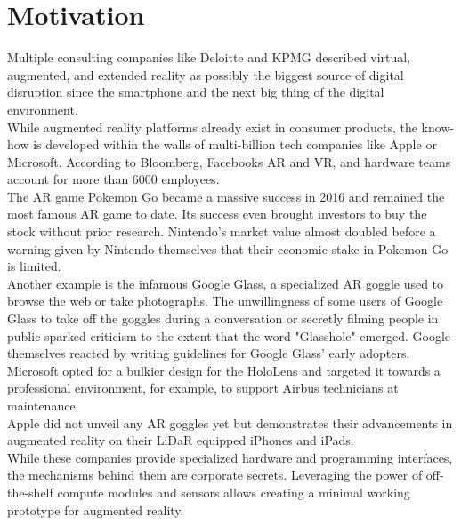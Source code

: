 \chapter{Motivation}
\label{sec:Motivation}
Multiple consulting companies like Deloitte and KPMG described virtual, augmented, and extended reality as possibly the biggest source of digital disruption since the smartphone\cite{KPMG_on_AR} and the next big thing of the digital environment\cite{Deloitte_on_AR}.\\
While augmented reality platforms already exist in consumer products, the know-how is developed within the walls of multi-billion tech companies like Apple or Microsoft. According to Bloomberg, Facebooks AR and VR, and hardware teams account for more than 6000 employees\cite{Bloomberg_on_AR}. \\
The AR game Pokemon Go became a massive success in 2016 and remained the most famous AR game to date. Its success even brought investors to buy the stock without prior research. Nintendo's market value almost doubled before a warning given by Nintendo themselves that their economic stake in Pokemon Go is limited.\cite{Nintendo_stock}\\ 
Another example is the infamous Google Glass, a specialized AR goggle used to browse the web or take photographs.\cite{Google_Glass} The unwillingness of some users of Google Glass to take off the goggles during a conversation or secretly filming people in public sparked criticism to the extent that the word "Glasshole" emerged.\cite{Glasshole} Google themselves reacted by writing guidelines for Google Glass’ early adopters.\cite{Glasshole}\\
Microsoft opted for a bulkier design for the HoloLens\cite{Hololens} and targeted it towards a professional environment, for example, to support Airbus technicians at maintenance\cite{AirbusHololens}.\\
Apple did not unveil any AR goggles yet but demonstrates their advancements in augmented reality on their LiDaR equipped iPhones and iPads.\cite{AppleLidar}\\
While these companies provide specialized hardware and programming interfaces, the mechanisms behind them are corporate secrets. Leveraging the power of off-the-shelf compute modules and sensors allows creating a minimal working prototype for augmented reality.

